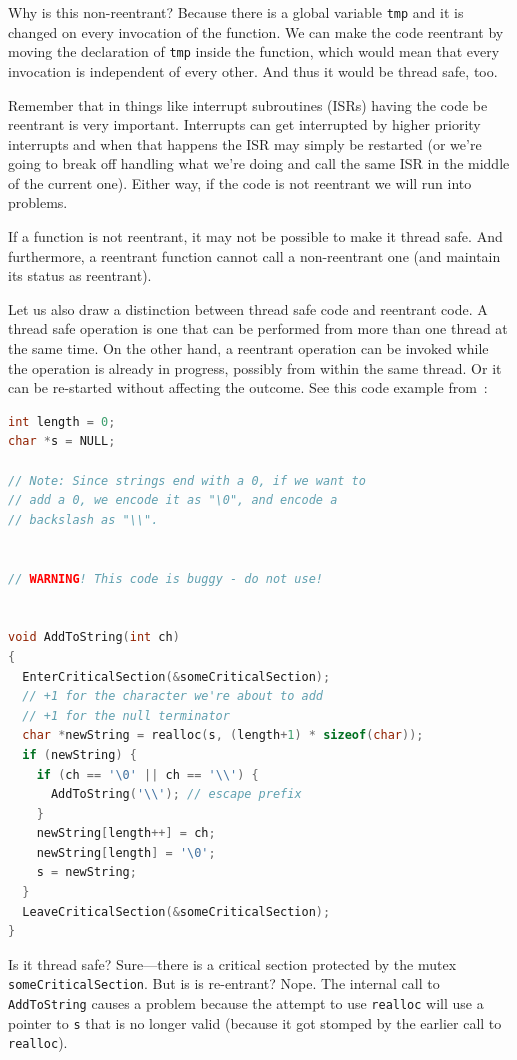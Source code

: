 \documentclass[a4paper]{report}
\begin{document}
Why is this non-reentrant? Because there is a global variable \texttt{tmp} and it is changed on every invocation of the function. We can make the code reentrant by moving the declaration of \texttt{tmp} inside the function, which would mean that every invocation is independent of every other. And thus it would be thread safe, too.

Remember that in things like interrupt subroutines (ISRs) having the code be reentrant is very important. Interrupts can get interrupted by higher priority interrupts and when that happens the ISR may simply be restarted (or we're going to break off handling what we're doing and call the same ISR in the middle of the current one). Either way, if the code is not reentrant we will run into problems.

If a function is not reentrant, it may not be possible to make it thread safe. And furthermore, a reentrant function cannot call a non-reentrant one (and maintain its status as reentrant).

Let us also draw a distinction between thread safe code and reentrant code. A thread safe operation is one that can be performed from more than one thread at the same time. On the other hand, a reentrant operation can be invoked while the operation is already in progress, possibly from within the same thread. Or it can be re-started without affecting the outcome. See this code example from~\cite{tont:threadsafe}:
\begin{lstlisting}[language=C]
int length = 0;
char *s = NULL;

// Note: Since strings end with a 0, if we want to
// add a 0, we encode it as "\0", and encode a
// backslash as "\\".


// WARNING! This code is buggy - do not use!


void AddToString(int ch)
{
  EnterCriticalSection(&someCriticalSection);
  // +1 for the character we're about to add
  // +1 for the null terminator
  char *newString = realloc(s, (length+1) * sizeof(char));
  if (newString) {
    if (ch == '\0' || ch == '\\') {
      AddToString('\\'); // escape prefix
    }
    newString[length++] = ch;
    newString[length] = '\0';
    s = newString;
  }
  LeaveCriticalSection(&someCriticalSection);
}
\end{lstlisting}

Is it thread safe? Sure---there is a critical section protected by the mutex \texttt{someCriticalSection}. But is is re-entrant? Nope. The internal call to \texttt{AddToString} causes a problem because the attempt to use \texttt{realloc} will use a pointer to \texttt{s} that is no longer valid (because it got stomped by the earlier call to \texttt{realloc}).
\end{document}
